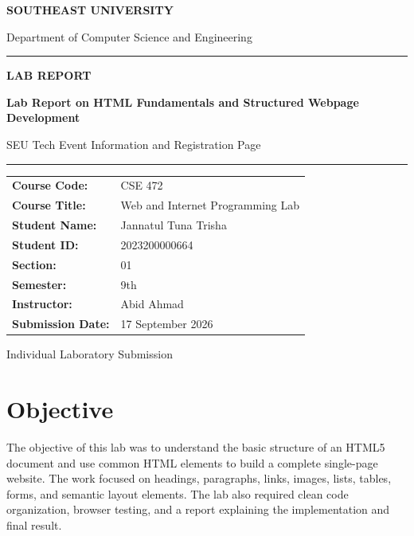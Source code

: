 \documentclass[12pt,a4paper]{article}
\begin{document}
\begin{titlepage}
\centering
\vspace*{1cm}
{\Large\bfseries SOUTHEAST UNIVERSITY\par}
\vspace{0.25cm}
{\large Department of Computer Science and Engineering\par}
\vspace{1.3cm}
\rule{0.86\textwidth}{1.2pt}
\vspace{0.5cm}
{\Huge\bfseries\color{SEUNavy} LAB REPORT\par}
\vspace{0.4cm}
{\LARGE\bfseries Lab Report on HTML Fundamentals and Structured Webpage Development\par}
\vspace{0.3cm}
{\Large SEU Tech Event Information and Registration Page\par}
\vspace{0.5cm}
\rule{0.86\textwidth}{1.2pt}
\vspace{1.4cm}
\begin{tabular}{>{\bfseries}p{4.2cm} p{8cm}}
Course Code: & CSE 472 \\
Course Title: & Web and Internet Programming Lab \\
Student Name: & Jannatul Tuna Trisha \\
Student ID: & 2023200000664 \\
Section: & 01 \\
Semester: & 9th \\
Instructor: & Abid Ahmad \\
Submission Date: & 17 September 2026 \\
\end{tabular}
\vfill
{\large Individual Laboratory Submission\par}
\end{titlepage}

\tableofcontents
\newpage

\section{Objective}
The objective of this lab was to understand the basic structure of an HTML5 document and use common HTML elements to build a complete single-page website. The work focused on headings, paragraphs, links, images, lists, tables, forms, and semantic layout elements. The lab also required clean code organization, browser testing, and a report explaining the implementation and final result.
\end{document}
